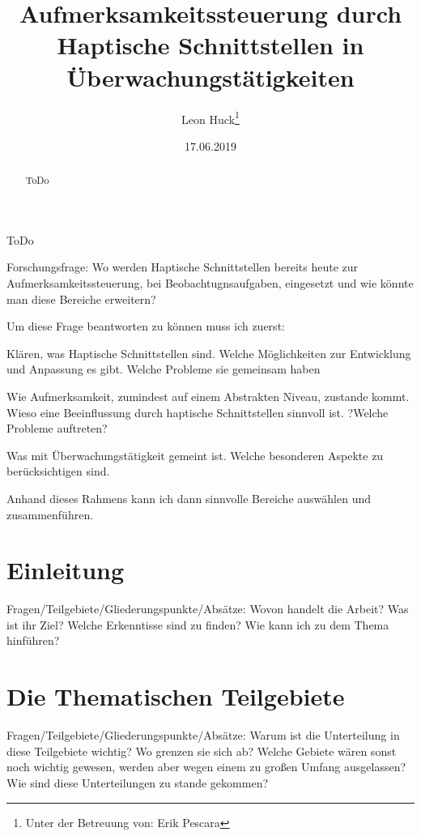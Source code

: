 \documentclass{llncs}					%
\title{Aufmerksamkeitssteuerung durch Haptische Schnittstellen in Überwachungstätigkeiten}
\author{Leon Huck\thanks{Unter der Betreuung von: Erik Pescara}}
\institute{Karlsruher Institut für Technology}
\date{17.06.2019}
\begin{document}
	
\maketitle

\begin{description}
	\item ToDo
\end{description}

\begin{abstract}
	ToDo
\end{abstract}

\begin{flushleft}
	Forschungsfrage:
	Wo werden Haptische Schnittstellen bereits heute zur Aufmerksamkeitssteuerung, bei Beobachtugnsaufgaben, eingesetzt und wie könnte man diese Bereiche erweitern?
	
	Um diese Frage beantworten zu können muss ich zuerst:
	\item Klären, was Haptische Schnittstellen sind. Welche Möglichkeiten zur  Entwicklung und Anpassung es gibt. Welche Probleme sie gemeinsam haben
	\item Wie Aufmerksamkeit, zumindest auf einem Abstrakten Niveau, zustande kommt. Wieso eine Beeinflussung durch haptische Schnittstellen sinnvoll ist. ?Welche Probleme auftreten?
	\item Was mit Überwachungstätigkeit gemeint ist. Welche besonderen Aspekte zu berücksichtigen sind.
	\item Anhand dieses Rahmens kann ich dann sinnvolle Bereiche auswählen und zusammenführen.
\end{flushleft}
\newpage
\tableofcontents
\newpage

\newpage
\section{Einleitung}
Fragen/Teilgebiete/Gliederungspunkte/Absätze:
Wovon handelt die Arbeit?
Was ist ihr Ziel?
Welche Erkenntisse sind zu finden?
Wie kann ich zu dem Thema hinführen?

\section{Die Thematischen Teilgebiete}
Fragen/Teilgebiete/Gliederungspunkte/Absätze:
Warum ist die Unterteilung in diese Teilgebiete wichtig?
Wo grenzen sie sich ab?
Welche Gebiete wären sonst noch wichtig gewesen, werden aber wegen einem zu großen Umfang ausgelassen?
Wie sind diese Unterteilungen zu stande gekommen?
\end{document}
